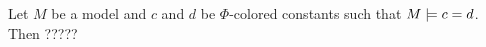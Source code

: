 \begin{comment}
\begin{lemma}
	Let $s$ and $t$ be terms such that no $x_i$ occurs in them, $\Phi$ a set of formulas and $M$ a model.
	Then $M\entails \lft{\Phi}{x}{s} = \lft{\Phi}{x}{t}$ implies that $M\entails s=t$.
	\label{lemma:lift_equality}
\end{lemma}
\begin{proof}
	Suppose no $\Delta$-term occurs in $s$ or $t$. Then $\lft{\Phi}{x}{s} = s$ 
	and $\lft{\Phi}{x}{t} = t$.

	Otherwise let $t_i$ be a maximal $\Delta$-term in $s$. Suppose it occurs at position $p$. In $\lft{\Phi}{x}{s}$, it is replaced by $x_i$.
	But as $M \entails \lft{\Phi}{x}{s} = \lft{\Phi}{x}{t}$, two situations can arise:
	\begin{compactenum}
	\item $x_i$ occurs at $p$ in $\lft{\Phi}{x}{t}$.
		As $x_i$ does not occur in $t$, it is placed there by the lifting.
		But $x_i$ is only employed in order to replace $t_i$, so at position $p$ in $t$, we have $t_i$.
	\item A term $r$ occurs at $p$ in $\lft{\Phi}{x}{t}$ which does not influence the evaluation of $\lft{\Phi}{x}{t}$ in $M$. This can be the case if $r$ is contained in a subterm of $u$ and in $M$, the function symbol of $u$ is interpreted such that it does not depend on the argument that contains $r$.
		
		But as the maximal $\Delta$-term $t_i$ occurs in $s$ at $p$ and $M \entails \lft{\Phi}{x}{s} = \lft{\Phi}{x}{t}$, there is a function symbol $u'$ in $\lft{\Phi}{x}{s}$ corresponding to $u$ which also does not depend on this argument.

		Hence even though $s$ and $t$ are not syntactically equal, $M\entails s=t$ in this case. \qedhere
	\end{compactenum}

\end{proof}
\end{comment}


\begin{exa}
	Let $M$ be a model and $c$ and $d$ be $\Phi$-colored constants such that $M\models c=d$.  
	Then ?????
\end{exa}


